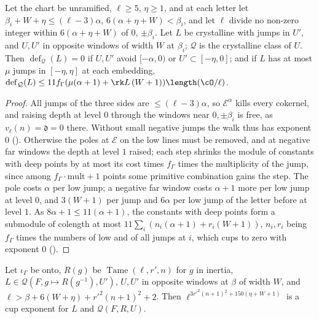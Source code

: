 \begin{theorem}
\label{cg-lifting:thm:generic}
Let the chart be unramified, $\ell\ge5$, $\eta\ge1$, and at each letter let
$\beta_i+W+\eta\le(\ell-3)\alpha$, $6(\alpha+\eta+W)<\beta_i$, and let $\ell$ divide no non-zero
integer within $6(\alpha+\eta+W)$ of $0$, $\pm\beta_i$. Let $L$ be crystalline with jumps in $U'$, and
$U,U'$ in opposite windows of width $W$ at $\beta_i$; $\mathcal Q$ is the crystalline class of $U$.
Then $\operatorname{def}_{\mathcal Q}(L)=0$ if
$U,U'$ avoid $[-\alpha,0)$ or $U'\subset[-\eta,0]$; and if $L$ has at most $\mu$ jumps in
$[-\eta,\eta]$ at each embedding, $\operatorname{def}_{\mathcal Q}(L)\le11f_\Gamma(\mu(\alpha+1)+\rk
L\,(W+1))\length(\cO/\ell)$.
\end{theorem}

\begin{proof}
All jumps of the three sides are $\le(\ell-3)\alpha$, so $\mathcal E^\alpha$ kills every cokernel, and
raising depth at level $0$ through the windows near $0,\pm\beta_i$ is free, as $v_\ell(n)=\mathfrak d=0$
there. Without small negative
jumps the walk thus has exponent $0$
(). Otherwise
the poles at $\mathcal E$ on the low lines must be removed, and at negative far windows the depth at
level $1$ raised; each step shrinks the module of constants with
deep points by at most its cost times $f_\Gamma$ times the multiplicity of the jump, since among
$f_\Gamma\cdot\mathrm{mult}+1$ points some primitive combination gains the step. The pole costs
$\alpha$ per low jump; a negative far window costs $\alpha+1$ more per low jump at level $0$, and
$3(W+1)$ per jump and $6\alpha$ per low jump of the letter before at level $1$. As
$8\alpha+1\le11(\alpha+1)$, the constants with deep points form a submodule of colength at most $11\sum_i(n_i(\alpha+1)+r_i(W+1))$, $n_i,r_i$ being
$f_\Gamma$ times the numbers of low and of all jumps at $i$, which cups to zero with exponent $0$
().
\end{proof}

\begin{proposition}\label{cg-lifting:prop:tame}
Let $\iota_\Gamma$ be onto, $R(g)$ be $\operatorname{Tame}(\ell,r',n)$ for $g$ in inertia,
$L\in\mathcal Q(F,g\mapsto R(g^{-1}),U')$, $U,U'$ in opposite windows at $\beta$ of width $W$, and
$\ell>\beta+6(W+\eta)+r'^2(n+1)^2+2$. Then $\ell^{3r'^2(n+1)^2+150(\eta+W+1)}$ is a cup exponent for
$L$ and $\mathcal Q(F,R,U)$.
\end{proposition}

